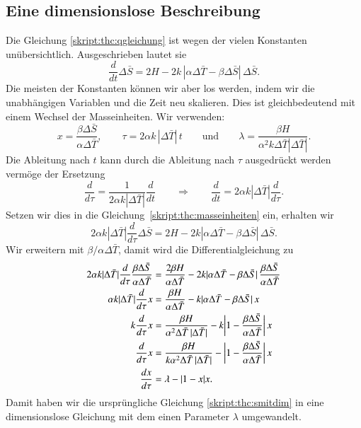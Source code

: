 \subsection{Eine dimensionslose Beschreibung}
Die Gleichung \eqref{skript:thc:qgleichung} ist wegen der vielen
Konstanten unübersichtlich.
Ausgeschrieben lautet sie
\begin{equation}
\frac{d}{dt}\Delta\bar S
=
2H
-2k\,|\alpha\Delta\bar T- \beta \Delta\bar S|\,\Delta\bar S.
\label{skript:thc:smitdim}
\end{equation}
Die meisten der Konstanten können wir aber los werden, indem wir 
die unabhängigen Variablen und die Zeit neu skalieren.
Dies ist gleichbedeutend mit einem Wechsel der Masseinheiten.
Wir verwenden:
\begin{equation}
x=\frac{\beta\Delta\bar S}{\alpha\Delta\bar T},
\qquad
\tau = 2\alpha k\,|\Delta\bar T|\, t
\qquad\text{und}\qquad
\lambda = \frac{\beta H}{\alpha^2 k\Delta\bar T|\Delta\bar T|}.
\label{skript:thc:masseinheiten}
\end{equation}
Die Ableitung nach $t$ kann durch die Ableitung nach $\tau$ ausgedrückt
werden vermöge der Ersetzung
\[
\frac{d}{d\tau}
=
\frac{1}{2\alpha k|\Delta\bar T|}
\frac{d}{dt}
\qquad\Rightarrow\qquad
\frac{d}{dt}
=
2\alpha k|\Delta\bar T|\frac{d}{d\tau}.
\]
Setzen wir dies in die Gleichung~\eqref{skript:thc:masseinheiten}
ein, erhalten wir
\begin{equation}
2\alpha k|\Delta\bar T|
\frac{d}{d\tau} \Delta\bar S
=
2H-2k|\alpha\Delta\bar T-\beta\Delta\bar S|\,\Delta\bar S.
\end{equation}
Wir erweitern mit $\beta/\alpha\Delta\bar T$, damit wird die
Differentialgleichung zu
\begin{align}
2\alpha k|\Delta\bar T|
\frac{d}{d\tau}\frac{\beta\Delta\bar S}{\alpha\Delta\bar T}
&=
\frac{2\beta H}{\alpha\Delta\bar T} - 2k|\alpha\Delta\bar T-\beta\Delta\bar S|\,
\frac{\beta\Delta\bar S}{\alpha\Delta\bar T}
\notag
\\
\alpha k|\Delta\bar T|
\frac{d}{d\tau}x
&=
\frac{\beta H}{\alpha\Delta\bar T}
-k|\alpha\Delta\bar T-\beta\Delta\bar S|\, x
\notag
\\
k
\frac{d}{d\tau}x
&=
\frac{\beta H}{\alpha^2\Delta\bar T\,|\Delta\bar T|}
-k\biggl|1-\frac{\beta\Delta\bar S}{\alpha\Delta\bar T}\biggr|\,x
\notag
\\
\frac{d}{d\tau}x
&=
\frac{\beta H}{k\alpha^2\Delta\bar T\,|\Delta\bar T|}
-\biggl|1-\frac{\beta\Delta\bar S}{\alpha\Delta\bar T}\biggr|\,x
\notag
\\
\frac{dx}{d\tau}
&=
\lambda - |1-x|x.
\label{skript:thc:dimensionslos}
\end{align}
Damit haben wir die ursprüngliche Gleichung
\eqref{skript:thc:smitdim}
in eine dimensionslose Gleichung mit dem einen Parameter $\lambda$
umgewandelt.

